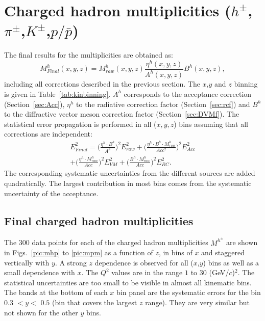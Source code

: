 
\section{Charged hadron multiplicities ($h^{\pm}$,$\pi^{\pm}$,$K^{\pm}$,$p/\bar{p}$)}

The final results for the multiplicities are obtained as:
%
\begin{equation}
  	M^h_{Final}(x,y,z) = M^h_{raw}(x,y,z)\frac{\eta^h(x,y,z)}{A^h(x,y,z)}B^h(x,y,z),
\end{equation}
%
including all corrections described in the previous section.
The $x$,$y$ and $z$ binning is given in Table~\ref{tab:kinbinning}. $A^h$ corresponds to the acceptance correction (Section~\ref{sec:Acc}), $\eta^h$ to the radiative correction factor (Section~\ref{sec:rcf}) and $B^h$ to the diffractive vector meson correction factor (Section~\ref{sec:DVMf}). The statistical error propagation is performed in all ($x,y,z$) bins assuming that all corrections are independent:
%
\begin{equation}
\begin{split}
		E^2_{Final} = \bigg( \frac{\eta^h \cdot B^h}{A^h} \bigg)^2 E^2_{raw} + \bigg(\frac{\eta^h \cdot B^h \cdot M^h_{raw}}{Acc^2} \bigg)^2 E^2_{Acc} \\
		+ \bigg(\frac{\eta^h \cdot M^h_{raw}}{Acc} \bigg)^2 E^2_{VM} + \bigg(\frac{B^h \cdot M^h_{raw}}{Acc} \bigg)^2 E^2_{RC}.
\end{split}
\end{equation}
%
The corresponding systematic uncertainties from the different sources are added quadratically. The largest contribution in most bins comes from the systematic uncertainty of the acceptance.

\subsection{Final charged hadron multiplicities}

The 300 data points for each of the charged hadron multiplicities $M^{h^{\pm}}$ are shown in Figs.~\ref{pic:mhp} to \ref{pic:mpm} as a function of $z$, in bins of $x$ and staggered vertically with $y$. A strong $z$ dependence is observed for all ($x$,$y$) bins as well as a small dependence with $x$. The $Q^2$ values are in the range $1$ to $30$ (GeV/$c$)$^2$. The statistical uncertainties are too small to be visible in almost all kinematic bins. The bands at the bottom of each $x$ bin panel are the systematic errors for the bin $0.3$ $< y <$ $0.5$ (bin that covers the largest $z$ range). They are very similar but not shown for the other $y$ bins.

